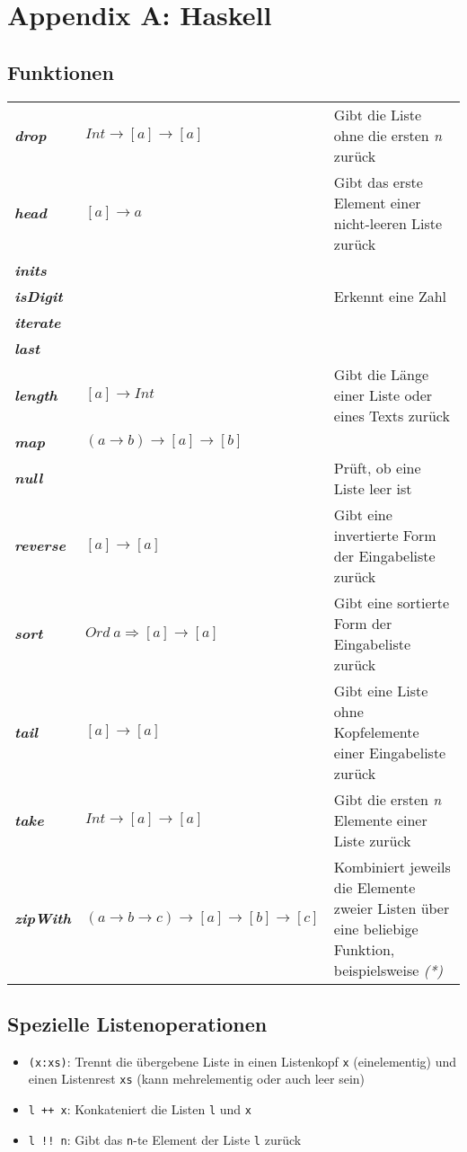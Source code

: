 \section{Appendix A: Haskell}

\subsection{Funktionen}
\begin{table}[H]
\begin{tabularx}{\textwidth}{l|X|X}
	\textbf{\textit{drop}} & \(Int \rightarrow [a] \rightarrow [a]\) & Gibt die Liste ohne die ersten \textit{n} zurück \\
	\textbf{\textit{head}} & \([a] \rightarrow a\) & Gibt das erste Element einer nicht-leeren Liste zurück \\
	\textbf{\textit{inits}} & & \\
	\textbf{\textit{isDigit}} & & Erkennt eine Zahl \\
	\textbf{\textit{iterate}} & & \\
	\textbf{\textit{last}} & & \\
	\textbf{\textit{length}} & \([a] \rightarrow Int\) & Gibt die Länge einer Liste oder eines Texts zurück \\
	\textbf{\textit{map}} & \((a \rightarrow b) \rightarrow [a] \rightarrow [b]\) & \\
	\textbf{\textit{null}} & & Prüft, ob eine Liste leer ist \\
	\textbf{\textit{reverse}} & \([a] \rightarrow [a]\) & Gibt eine invertierte Form der Eingabeliste zurück \\
	\textbf{\textit{sort}} & \(Ord~a \Rightarrow [a] \rightarrow [a]\) & Gibt eine sortierte Form der Eingabeliste zurück \\
	\textbf{\textit{tail}} & \([a] \rightarrow [a]\) & Gibt eine Liste ohne Kopfelemente einer Eingabeliste zurück \\
	\textbf{\textit{take}} & \(Int \rightarrow [a] \rightarrow [a]\) & Gibt die ersten \textit{n} Elemente einer Liste zurück \\
	\textbf{\textit{zipWith}} & \((a \rightarrow b \rightarrow c) \rightarrow [a] \rightarrow [b] \rightarrow [c]\) & Kombiniert jeweils die Elemente zweier Listen über eine beliebige Funktion, beispielsweise \textit{(*)} \\
\end{tabularx}
\end{table}


\subsection{Spezielle Listenoperationen}
\begin{itemize}
	\item \texttt{(x:xs)}: Trennt die übergebene Liste in einen Listenkopf \texttt{x} (einelementig) und einen Listenrest \texttt{xs} (kann mehrelementig oder auch leer sein)
	\item \texttt{l ++ x}: Konkateniert die Listen \texttt{l} und \texttt{x}
	\item \texttt{l !! n}: Gibt das \texttt{n}-te Element der Liste \texttt{l} zurück 
\end{itemize}


